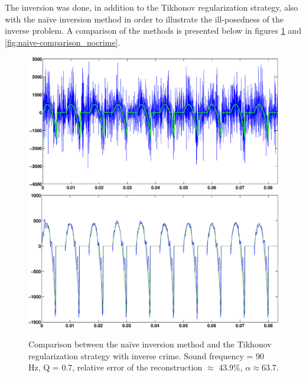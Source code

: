 \documentclass[12pt,a4]{article}
\begin{document}
The inversion was done, in addition to the Tikhonov regularization strategy, also with the naïve inversion method in order to illustrate the ill-posedness of the inverse problem.
A comparison of the methods is presented below in figures \ref{fig:naive-comparison_crime} and \ref{fig:naive-comparison_nocrime}.
\begin{figure}[H]
\begin{center}
\includegraphics[scale=.3]{img/naive_test_naive.eps}
\includegraphics[scale=.3]{img/naive_test_morozov.eps}
\end{center}
\caption{Comparison between the naïve inversion method and the Tikhonov regularization strategy with inverse crime. Sound frequency = 90 Hz, Q = 0.7, relative error of the reconstruction $\approx$ 43.9\%, $\alpha \approx 63.7$.}
\label{fig:naive-comparison_crime}
\end{figure}
\end{document}
